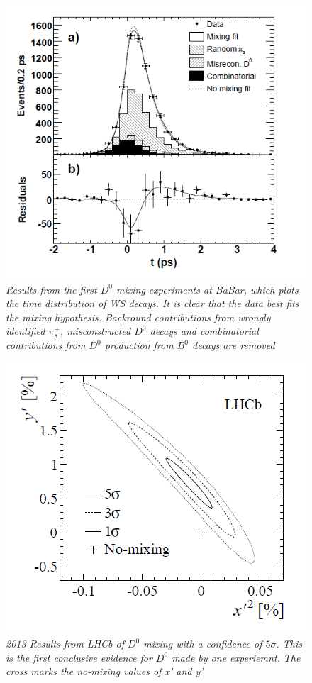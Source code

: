 \begin{figure}[h!]
\begin{center}
\includegraphics[scale=0.4]{figs/BaBar_D0_Mixing_Results.png}
\end{center}
\caption{\textit{Results from the first $D^{0}$ mixing experiments at BaBar, which plots the time distribution of WS decays. It is clear that the data best fits the mixing hypothesis. Backround contributions from wrongly identified $\pi^{+}_{s}$, misconstructed $D^{0}$ decays and combinatorial contributions from $D^{0}$ production from $B^{0}$ decays are removed}}
\label{BaBar_D0_Mixing_Results.png}
\end{figure}

\begin{figure}[h!]
\begin{center}
\includegraphics[scale=0.4]{figs/LHCb_D0_Mixing_Results.png}
\end{center}
\caption{\textit{2013 Results from LHCb of $D^{0}$ mixing with a confidence of $5 \sigma$. This is the first conclusive evidence for $D^{0}$ made by one experiemnt. The cross marks the no-mixing values of x' and y'}}
\label{LHCb_D0_Mixing_Results.png}
\end{figure}

